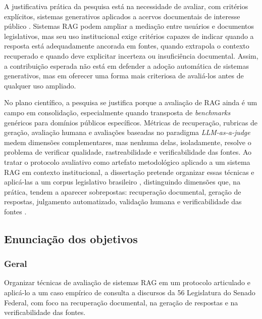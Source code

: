 A justificativa prática da pesquisa está na necessidade de avaliar, com critérios explícitos, sistemas generativos aplicados a acervos documentais de interesse público \parencite{wfd2023guidelinesAiParliaments,ipu2024aiParliaments,deAlmeidaSantos2025aiGovernance}. Sistemas RAG podem ampliar a mediação entre usuários e documentos legislativos, mas seu uso institucional exige critérios capazes de indicar quando a resposta está adequadamente ancorada em fontes, quando extrapola o contexto recuperado e quando deve explicitar incerteza ou insuficiência documental. Assim, a contribuição esperada não está em defender a adoção automática de sistemas generativos, mas em oferecer uma forma mais criteriosa de avaliá-los antes de qualquer uso ampliado.

No plano científico, a pesquisa se justifica porque a avaliação de RAG ainda é um campo em consolidação, especialmente quando transposta de \textit{benchmarks} genéricos para domínios públicos específicos. Métricas de recuperação, rubricas de geração, avaliação humana e avaliações baseadas no paradigma \textit{LLM-as-a-judge} medem dimensões complementares, mas nenhuma delas, isoladamente, resolve o problema de verificar qualidade, rastreabilidade e verificabilidade das fontes. Ao tratar o protocolo avaliativo como artefato metodológico aplicado a um sistema RAG em contexto institucional, a dissertação pretende organizar essas técnicas e aplicá-las a um corpus legislativo brasileiro \parencite{hevnerEtAl2004designScience,peffersEtAl2007dsrm}, distinguindo dimensões que, na prática, tendem a aparecer sobrepostas: recuperação documental, geração de respostas, julgamento automatizado, validação humana e verificabilidade das fontes \parencite{esEtAl2023ragas,saadFalconEtAl2024ares,pipitoneAlami2024legalbenchRag}.

\subsection{Enunciação dos objetivos}

\subsubsection{Geral}

Organizar técnicas de avaliação de sistemas RAG em um protocolo articulado e aplicá-lo a um caso empírico de consulta a discursos da 56\textordfeminine{} Legislatura do Senado Federal, com foco na recuperação documental, na geração de respostas e na verificabilidade das fontes.

